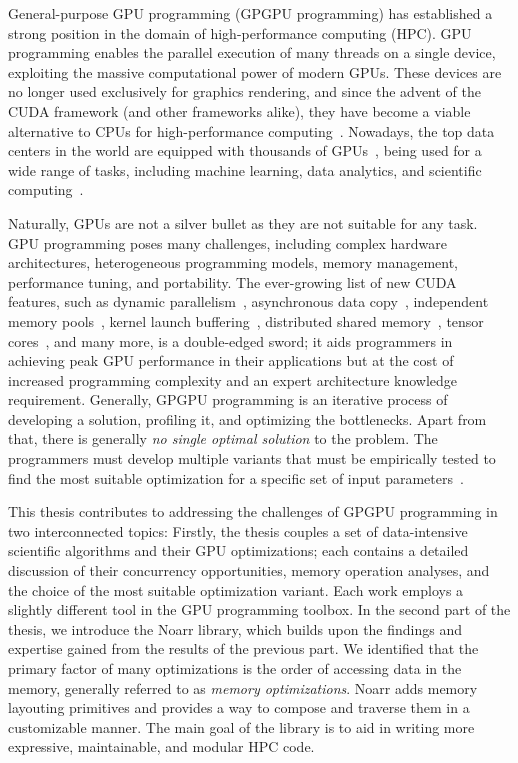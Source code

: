 
General-purpose GPU programming (GPGPU programming) has established a strong position in the domain of high-performance computing (HPC).
GPU programming enables the parallel execution of many threads on a single device, exploiting the massive computational power of modern GPUs.
These devices are no longer used exclusively for graphics rendering, and since the advent of the CUDA framework (and other frameworks alike), they have become a viable alternative to CPUs for high-performance computing~\cite{khairy2019survey}.
Nowadays, the top data centers in the world are equipped with thousands of GPUs~\cite{top500}, being used for a wide range of tasks, including machine learning, data analytics, and scientific computing~\cite{mittal2019survey,bress2014gpu,kalaiselvi2017survey}.

Naturally, GPUs are not a silver bullet as they are not suitable for any task.
GPU programming poses many challenges, including complex hardware architectures, heterogeneous programming models, memory management, performance tuning, and portability.
The ever-growing list of new CUDA features, such as dynamic parallelism~\cite{wang2014characterization}, asynchronous data copy~\cite{pearson2019evaluating}, independent memory pools~\cite{qian2023empirical}, kernel launch buffering~\cite{lin2021efficient}, distributed shared memory~\cite{choquette2023nvidia}, tensor cores~\cite{dakkak2019accelerating}, and many more, is a double-edged sword;
it aids programmers in achieving peak GPU performance in their applications but at the cost of increased programming complexity and an expert architecture knowledge requirement.
Generally, GPGPU programming is an iterative process of developing a solution, profiling it, and optimizing the bottlenecks.
Apart from that, there is generally \emph{no single optimal solution} to the problem. The programmers must develop multiple variants that must be empirically tested to find the most suitable optimization for a specific set of input parameters~\cite{hijma2023optimization}.

This thesis contributes to addressing the challenges of GPGPU programming in two interconnected topics:
Firstly, the thesis couples a set of data-intensive scientific algorithms and their GPU optimizations; each contains a detailed discussion of their concurrency opportunities, memory operation analyses, and the choice of the most suitable optimization variant. Each work employs a slightly different tool in the GPU programming toolbox.
In the second part of the thesis, we introduce the Noarr library, which builds upon the findings and expertise gained from the results of the previous part. We identified that the primary factor of many optimizations is the order of accessing data in the memory, generally referred to as \emph{memory optimizations}.
Noarr adds memory layouting primitives and provides a way to compose and traverse them in a customizable manner. The main goal of the library is to aid in writing more expressive, maintainable, and modular HPC code.

